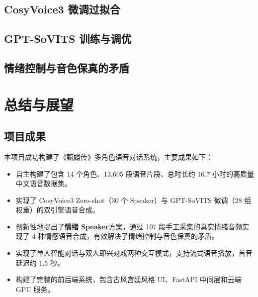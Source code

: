 \documentclass[12pt,a4paper]{article}
\begin{document}
\subsection{CosyVoice3 微调过拟合}
\label{sec:prob-overfit}


\subsection{GPT-SoVITS 训练与调优}
\label{sec:prob-gptsovits}


\subsection{情绪控制与音色保真的矛盾}
\label{sec:prob-emotion}



\section{总结与展望}
\label{sec:conclusion}

\subsection{项目成果}

本项目成功构建了《甄嬛传》多角色语音对话系统，主要成果如下：

\begin{itemize}[leftmargin=*]
    \item 自主构建了包含 14 个角色、13,605 段语音片段、总时长约 16.7 小时的高质量中文语音数据集。
    \item 实现了 CosyVoice3 Zero-shot（30 个 Speaker）与 GPT-SoVITS 微调（28 组权重）的双引擎语音合成。
    \item 创新性地提出了\textbf{情绪 Speaker}方案，通过 107 段手工采集的真实情绪音频实现了 4 种情感语音合成，有效解决了情绪控制与音色保真的矛盾。
    \item 实现了单人智能对话与双人即兴对戏两种交互模式，支持流式语音播放，首音延迟约 1.5 秒。
    \item 构建了完整的前后端系统，包含古风宫廷风格 UI、FastAPI 中间层和云端 GPU 服务。
\end{itemize}
\end{document}
